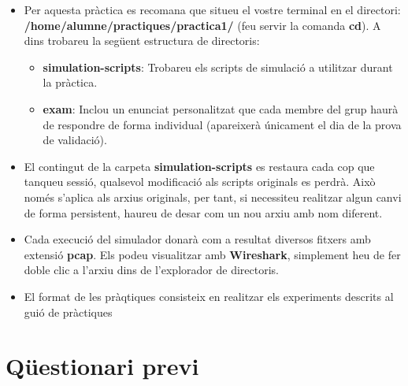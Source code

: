 \documentclass[12pt,a4paper]{article}
\begin{document}
\begin{itemize}
 \item Per aquesta pràctica es recomana que situeu el vostre terminal en el directori: \textbf{/home/alumne/practiques/practica1/} (feu servir la comanda \textbf{cd}). A dins trobareu la següent estructura de directoris:
    \begin{itemize}        
        \item\textbf{simulation-scripts}: Trobareu els scripts de simulació a utilitzar durant la pràctica.
        \item\textbf{exam}: Inclou un enunciat personalitzat que cada membre del grup haurà de respondre de forma individual (apareixerà únicament el dia de la prova de validació).
    \end{itemize}
 
 \item El contingut de la carpeta \textbf{simulation-scripts} es restaura cada cop que tanqueu sessió, qualsevol modificació als scripts originals es perdrà. Això només s'aplica als arxius originals, per tant, si necessiteu realitzar algun canvi de forma persistent, haureu de desar com un nou arxiu amb nom diferent.
 
 \item Cada execució del simulador donarà com a resultat diversos fitxers amb extensió \textbf{pcap}. Els podeu visualitzar amb \textbf{Wireshark}, simplement heu de fer doble clic a l'arxiu dins de l'explorador de directoris.  

 \item El format de les pràqtiques consisteix en realitzar els experiments descrits al guió de pràctiques
 \end{itemize}

 \newpage
\section {Qüestionari previ}
\end{document}

